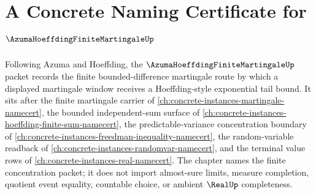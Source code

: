 \chapter{A Concrete Naming Certificate for $\AzumaHoeffdingFiniteMartingaleUp$}
\label{ch:concrete-instances-azuma-hoeffding-finite-martingale-namecert}

Following Azuma and Hoeffding, the $\AzumaHoeffdingFiniteMartingaleUp$ packet records the finite bounded-difference martingale route by which a displayed martingale window receives a Hoeffding-style exponential tail bound. It sits after the finite martingale carrier of \autoref{ch:concrete-instances-martingale-namecert}, the bounded independent-sum surface of \autoref{ch:concrete-instances-hoeffding-finite-sum-namecert}, the predictable-variance concentration boundary of \autoref{ch:concrete-instances-freedman-inequality-namecert}, the random-variable readback of \autoref{ch:concrete-instances-randomvar-namecert}, and the terminal value rows of \autoref{ch:concrete-instances-real-namecert}. The chapter names the finite concentration packet; it does not import almost-sure limits, measure completion, quotient event equality, countable choice, or ambient $\RealUp$ completeness.

